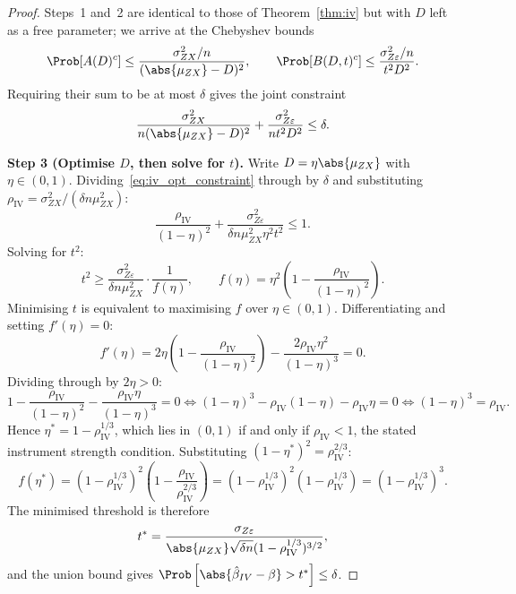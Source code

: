 \begin{proof}
    Steps~1 and~2 are identical to those of Theorem~\ref{thm:iv} but with $D$ left as a free parameter; we arrive at the Chebyshev bounds
    \[
        \Prob[A(D)^c] \leq \frac{\sigma_{ZX}^2/n}{(\abs{\mu_{ZX}}-D)^2}, \qquad \Prob[B(D,t)^c] \leq \frac{\sigma_{Z\varepsilon}^2/n}{t^2 D^2}.
    \]
    Requiring their sum to be at most $\delta$ gives the joint constraint
    \begin{equation}
    \label{eq:iv_opt_constraint}
        \frac{\sigma_{ZX}^2}{n(\abs{\mu_{ZX}}-D)^2} + \frac{\sigma_{Z\varepsilon}^2}{n t^2 D^2} \leq \delta.
    \end{equation}

    \medskip\noindent\textbf{Step 3 (Optimise $D$, then solve for $t$).}
    Write $D = \eta\abs{\mu_{ZX}}$ with $\eta\in(0,1)$. Dividing~\eqref{eq:iv_opt_constraint} through by $\delta$ and substituting $\rho_\mathrm{IV} = \sigma_{ZX}^2/(\delta n\mu_{ZX}^2)$:
    \[
        \frac{\rho_\mathrm{IV}}{(1-\eta)^2} + \frac{\sigma_{Z\varepsilon}^2}{\delta n\mu_{ZX}^2\eta^2 t^2} \leq 1.
    \]
    Solving for $t^2$:
    \[
        t^2 \geq
        \frac{\sigma_{Z\varepsilon}^2}{\delta n\mu_{ZX}^2}
        \cdot \frac{1}{f(\eta)},
        \qquad
        f(\eta) = \eta^2\!\left(1 - \frac{\rho_\mathrm{IV}}{(1-\eta)^2}\right).
    \]
    Minimising $t$ is equivalent to maximising $f$ over $\eta\in(0,1)$. Differentiating and setting $f'(\eta)=0$:
    \[
        f'(\eta) = 2\eta\!\left(1 - \frac{\rho_\mathrm{IV}}{(1-\eta)^2}\right) - \frac{2\rho_\mathrm{IV}\eta^2}{(1-\eta)^3} = 0.
    \]
    Dividing through by $2\eta > 0$:
    \[
        1 - \frac{\rho_\mathrm{IV}}{(1-\eta)^2} - \frac{\rho_\mathrm{IV}\eta}{(1-\eta)^3} = 0 \iff (1-\eta)^3 - \rho_\mathrm{IV}(1-\eta) - \rho_\mathrm{IV}\eta = 0 \iff (1-\eta)^3 = \rho_\mathrm{IV}.
    \]
    Hence $\eta^* = 1 - \rho_\mathrm{IV}^{1/3}$, which lies in $(0,1)$ if and only if $\rho_\mathrm{IV} < 1$, the stated instrument strength condition. Substituting $(1-\eta^*)^2 = \rho_\mathrm{IV}^{2/3}$:
    \[
        f(\eta^*) = (1-\rho_\mathrm{IV}^{1/3})^2\!\left(1 - \frac{\rho_\mathrm{IV}}{\rho_\mathrm{IV}^{2/3}}\right) = (1-\rho_\mathrm{IV}^{1/3})^2(1 - \rho_\mathrm{IV}^{1/3}) = (1-\rho_\mathrm{IV}^{1/3})^3.
    \]
    The minimised threshold is therefore
    \[
        t^* = \frac{\sigma_{Z\varepsilon}}{\abs{\mu_{ZX}}\sqrt{\delta n}(1-\rho_\mathrm{IV}^{1/3})^{3/2}},
    \]
    and the union bound gives $\Prob\left[\abs{\hat\beta_{IV}-\beta}>t^*\right]\leq\delta$.
\end{proof}


